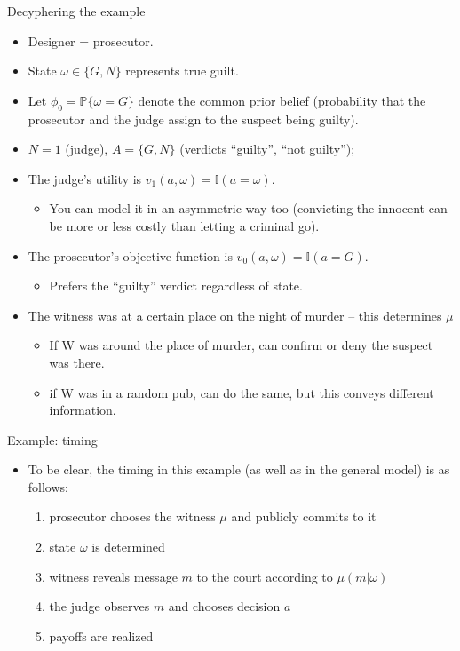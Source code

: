 \documentclass[english,10pt
,aspectratio=169
]{beamer}
\begin{document}
\begin{frame}{Decyphering the example}
\begin{itemize}
	\item Designer = prosecutor.
	\item State $\omega \in \{G,N\}$ represents true guilt. 
	\item Let $\phi_0 = \mathbb{P} \{ \omega = G \}$ denote the common prior belief (probability that the prosecutor and the judge assign to the suspect being guilty).
	\item $N=1$ (judge), $A = \{G,N\}$ (verdicts ``guilty'', ``not guilty'');
	\pause
	\item The judge's utility is $v_1(a,\omega) = \mathbb{I} (a=\omega)$.
	\begin{itemize}
		\item You can model it in an asymmetric way too (convicting the innocent can be more or less costly than letting a criminal go).
	\end{itemize}
	\item The prosecutor's objective function is $v_0(a,\omega) = \mathbb{I} (a=G)$.
	\begin{itemize}
		\item Prefers the ``guilty'' verdict regardless of state.
	\end{itemize}
	\pause
	\item The witness was at a certain place on the night of murder -- this determines $\mu$
	\begin{itemize}
		\item If W was around the place of murder, can confirm or deny the suspect was there.
		\item if W was in a random pub, can do the same, but this conveys different information.
	\end{itemize}
\end{itemize}
\end{frame}


\begin{frame}{Example: timing}
	\begin{itemize}
		\item To be clear, the timing in this example (as well as in the general model) is as follows:
		\begin{enumerate}
			\item prosecutor chooses the witness $\mu$ and publicly commits to it
			\item state $\omega$ is determined
			\item witness reveals message $m$ to the court according to $\mu(m|\omega)$
			\item the judge observes $m$ and chooses decision $a$
			\item payoffs are realized
		\end{enumerate}
	\end{itemize}
\end{frame}
\end{document}
